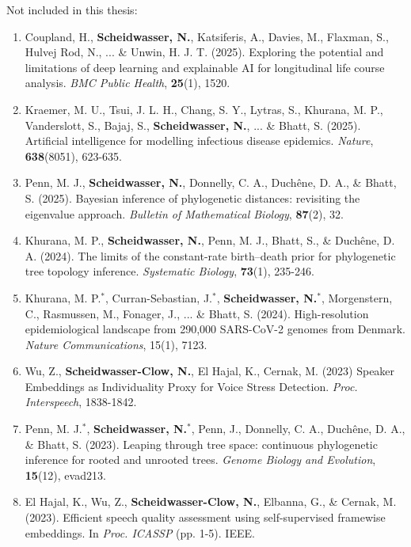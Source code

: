 {\small
\noindent Not included in this thesis:
\begin{enumerate}[noitemsep, topsep=0pt, leftmargin=*]
    \item Coupland, H., \textbf{Scheidwasser, N.}, Katsiferis, A., Davies, M., Flaxman, S., Hulvej Rod, N., ... \& Unwin, H. J. T. (2025). Exploring the potential and limitations of deep learning and explainable AI for longitudinal life course analysis. \textit{BMC Public Health}, \textbf{25}(1), 1520.
    \item Kraemer, M. U., Tsui, J. L. H., Chang, S. Y., Lytras, S., Khurana, M. P., Vanderslott, S., Bajaj, S., \textbf{Scheidwasser, N.}, ... \& Bhatt, S. (2025). Artificial intelligence for modelling infectious disease epidemics. \textit{Nature}, \textbf{638}(8051), 623-635.
    \item Penn, M. J., \textbf{Scheidwasser, N.}, Donnelly, C. A., Duchêne, D. A., \& Bhatt, S. (2025). Bayesian inference of phylogenetic distances: revisiting the eigenvalue approach. \textit{Bulletin of Mathematical Biology}, \textbf{87}(2), 32.
    \item Khurana, M. P., \textbf{Scheidwasser, N.}, Penn, M. J., Bhatt, S., \& Duchêne, D. A. (2024). The limits of the constant-rate birth–death prior for phylogenetic tree topology inference. \textit{Systematic Biology}, \textbf{73}(1), 235-246.
    \item Khurana, M. P.$^*$, Curran-Sebastian, J.$^*$, \textbf{Scheidwasser, N.}$^*$, Morgenstern, C., Rasmussen, M., Fonager, J., ... \& Bhatt, S. (2024). High-resolution epidemiological landscape from 290,000 SARS-CoV-2 genomes from Denmark. \textit{Nature Communications}, 15(1), 7123.
    \item Wu, Z., \textbf{Scheidwasser-Clow, N.}, El Hajal, K., Cernak, M. (2023) Speaker Embeddings as Individuality Proxy for Voice Stress Detection. \textit{Proc. Interspeech}, 1838-1842.
    \item Penn, M. J.$^*$, \textbf{Scheidwasser, N.}$^*$, Penn, J., Donnelly, C. A., Duchêne, D. A., \& Bhatt, S. (2023). Leaping through tree space: continuous phylogenetic inference for rooted and unrooted trees. \textit{Genome Biology and Evolution}, \textbf{15}(12), evad213.
    \item El Hajal, K., Wu, Z., \textbf{Scheidwasser-Clow, N.}, Elbanna, G., \& Cernak, M. (2023). Efficient speech quality assessment using self-supervised framewise embeddings. In \textit{Proc. ICASSP} (pp. 1-5). IEEE.
\end{enumerate}
}